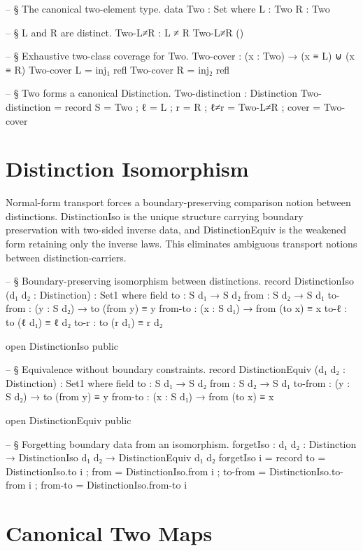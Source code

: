 \documentclass[11pt,a4paper]{book}
\def\texttt#1{#1}%
\begin{document}
\begin{code}
-- § The canonical two-element type.
data Two : Set where
  L : Two
  R : Two

-- § L and R are distinct.
Two-L≠R : L ≠ R
Two-L≠R ()

-- § Exhaustive two-class coverage for Two.
Two-cover : (x : Two) → (x ≡ L) ⊎ (x ≡ R)
Two-cover L = inj₁ refl
Two-cover R = inj₂ refl

-- § Two forms a canonical Distinction.
Two-distinction : Distinction
Two-distinction = record
  { S     = Two
  ; ℓ     = L
  ; r     = R
  ; ℓ≠r   = Two-L≠R
  ; cover = Two-cover
  }
\end{code}

\section{Distinction Isomorphism}

Normal-form transport forces a boundary-preserving comparison notion between distinctions.
\texttt{DistinctionIso} is the unique structure carrying boundary preservation with two-sided inverse data, and \texttt{DistinctionEquiv} is the weakened form retaining only the inverse laws.
This eliminates ambiguous transport notions between distinction-carriers.

\begin{code}
-- § Boundary-preserving isomorphism between distinctions.
record DistinctionIso (d₁ d₂ : Distinction) : Set1 where
  field
    to      : S d₁ → S d₂
    from    : S d₂ → S d₁
    to-from : (y : S d₂) → to (from y) ≡ y
    from-to : (x : S d₁) → from (to x) ≡ x
    to-ℓ    : to (ℓ d₁) ≡ ℓ d₂
    to-r    : to (r d₁) ≡ r d₂

open DistinctionIso public

-- § Equivalence without boundary constraints.
record DistinctionEquiv (d₁ d₂ : Distinction) : Set1 where
  field
    to      : S d₁ → S d₂
    from    : S d₂ → S d₁
    to-from : (y : S d₂) → to (from y) ≡ y
    from-to : (x : S d₁) → from (to x) ≡ x

open DistinctionEquiv public

-- § Forgetting boundary data from an isomorphism.
forgetIso : {d₁ d₂ : Distinction} → DistinctionIso d₁ d₂ → DistinctionEquiv d₁ d₂
forgetIso i = record
  { to      = DistinctionIso.to i
  ; from    = DistinctionIso.from i
  ; to-from = DistinctionIso.to-from i
  ; from-to = DistinctionIso.from-to i
  }
\end{code}

\section{Canonical Two Maps}
\end{document}
